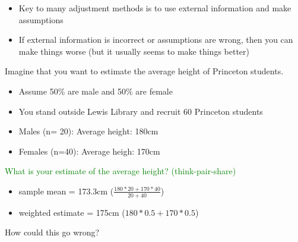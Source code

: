 \documentclass[aspectratio=169]{beamer}
\begin{document}
\begin{frame}

\begin{itemize}
\item Key to many adjustment methods is to use external information and make assumptions
\pause
\item If external information is incorrect or assumptions are wrong, then you can make things worse (but it usually seems to make things better)
\end{itemize}

\end{frame}
\begin{frame}

Imagine that you want to estimate the average height of Princeton students.\\
\begin{itemize}
\item Assume 50\% are male and 50\% are female
\item You stand outside Lewis Library and recruit 60 Princeton students
\item Males (n= 20): Average height: 180cm
\item Females (n=40): Average heigh: 170cm
\end{itemize}
\textcolor{green}{What is your estimate of the average height? (think-pair-share)}

\end{frame}
\begin{frame}

\begin{itemize}
\item sample mean = 173.3cm ($\frac{180 * 20 + 170 * 40}{20 + 40}$)
\pause
\item weighted estimate = 175cm ($180 * 0.5 + 170 * 0.5$)
\end{itemize}
\pause
How could this go wrong?

\end{frame}
\end{document}
